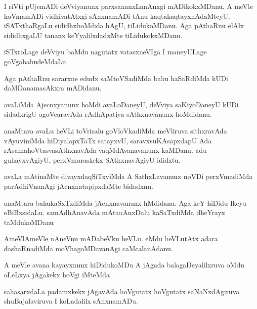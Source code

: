 \documentclass{article}
\begin{document}
\begin{mn}%
I riVti pUjemADi deVviyanunx parxsananxLanAnxgi mADikokxMDanu. A meVle hoVmamADi 
vidhivatAtxgi sAnxnamADi tAnu kaqtakaqtayxnAdaMteyU, iSATxthaRgaLu sididhxhoMdida hAgU, 
tiLidukoMDanu. Aga pAthaRnu elAlx sididhxgaLU tananx keYyalilxdadxMte tiLidukokxMDanu.
\end{mn}

\begin{mn}%
iSTxroLage deVviyu baMdu nagutatx vatasxneVIga I maneyULage goVgabahudeMdaLu.
\end{mn}

\begin{mn}%
Aga pAthaRnu sararxne edudx saMtoVSadiMda bahu haSaRdiMda kUDi daMDanamasAkxra mADidanu.
\end{mn}

\begin{mn}%
avaLiMda Ajecnxyanunx hoMdi avaLoDaneyU, deVviya saKiyoDaneyU kUDi sidadxrigU agoVcaravAda 
rAdhApatiya sAthxnavanunx hoMdidanu.
\end{mn}

\begin{mn}%
anaMtara avaLu heVLi toVrisalu goVloVkadiMda meVliruva sithxravAda vAyuviniMda 
hiDiyalapxTaTx satayxvU, saravxsuKAsapxdapU Ada rAsamahoVtasvasAthxnavAda vaqMdAvanavanunx 
kaMDanu. adu guhayxvAgiyU, perxVmaraskekx SAthxnavAgiyU ididxtu.
\end{mn}

\begin{mn}%
avaLa mAtinaMte divayxdaqSiTxyiMda A SathxLavanunx noVDi perxVmadiMda parAdhiVnanAgi 
jAcnxnatapipxdaMte bidadxnu.
\end{mn}

\begin{mn}%
anaMtara bahukaSxTxdiMda jAcnxnavanunx hMdidanu. Aga keY hiDidu Ikeyu eBiBxsidaLu. 
samAdhAnavAda mAtanAnxDalu kaSaTxdiMda dheYrayx taMdukoMDanu
\end{mn}

\begin{mn}%
AmeVlAmeVle nAneVnu mADabeVku heVLu. eMdu heVLutAtx adara dashaRnadiMda moVhagoMDavanAgi 
caMcalanAdanu.
\end{mn}

\begin{mn}%
A meVle avana kayayxnunx hiDidukoMDu A jAgada balagaDeyalilxruva oMdu oLeLxya jAgakekx 
hoVgi iMteMda 
\end{mn}

\begin{mn}%
sahasarxdaLa padamxkekx jAgavAda hoVgutatx hoVgutatx saNaNxdAgiruva shuBajalaviruva I 
koLadalilx sAnxnamADu.
\end{mn}
\end{document}
